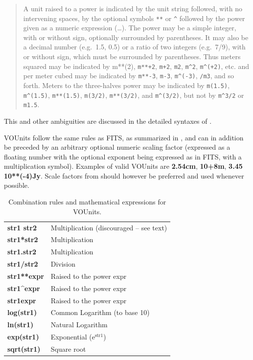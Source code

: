 \documentclass[11pt,notitlepage,onecolumn]{ivoa}
\def\eg{e.g.~}
\newcommand{\unit}[1]{\textbf{\textsf{\color{orange}#1}}}
\begin{document}
\begin{quote}
A unit raised to a power is indicated by the unit string followed,
with no intervening spaces, by the optional symbols \texttt{**}
or \texttt{\^{}} followed by the power given as a numeric expression (\dots). 
The power may be a simple integer, with or
without sign, optionally surrounded by parentheses. It may also
be a decimal number (\eg 1.5, 0.5) or a ratio of two integers
(\eg 7/9), with or without sign, which must be surrounded by
parentheses. Thus meters squared may be indicated by m**(2),
\texttt{m**+2}, \texttt{m+2}, \texttt{m2}, \texttt{m\^{}2}, \texttt{m\^{}(+2)}, etc. and per meter cubed may be
indicated by \texttt{m**-3}, \texttt{m-3}, \texttt{m\^{}(-3)}, \texttt{/m3}, and so forth. Meters to
the three-halves power may be indicated by \texttt{m(1.5)}, \texttt{m\^{}(1.5)},
\texttt{m**(1.5)}, \texttt{m(3/2)}, \texttt{m**(3/2)}, and \texttt{m\^{}(3/2)}, but not by \texttt{m\^{}3/2}
or \texttt{m1.5}.~\cite[\S4.3.1]{pence10}
\end{quote}

This and other ambiguities are discussed in the detailed syntaxes of .

VOUnits follow the same rules as FITS, as summarized in , and can in
addition be preceded by an arbitrary optional numeric scaling factor (expressed as a floating number with the optional
exponent being expressed as in FITS, with a multiplication symbol).
Examples of valid VOUnits are \unit{2.54cm}, \unit{10+8m}, \unit{3.45 10**(-4)Jy}. 
Scale factors from  should however be
preferred and used whenever possible.

\begin{table}
\begin{center}
\begin{tabular}[bht]{|l|l|}
\hline
\unit{str1 str2} & Multiplication (discouraged -- see text)\\
\unit{str1*str2} & Multiplication \\
\unit{str1.str2} & Multiplication \\
\unit{str1/str2} & Division \\
\unit{str1**expr} & Raised to the power expr \\
\unit{str1\^{}expr} & Raised to the power expr \\
\unit{str1expr} & Raised to the power expr \\
\unit{log(str1)} & Common Logarithm (to base 10) \\
\unit{ln(str1)} & Natural Logarithm \\
\unit{exp(str1)} & Exponential (e$^\mathrm{str1}$) \\
\unit{sqrt(str1)} & Square root \\
\hline
\end{tabular}
\end{center}
 \caption{Combination rules and mathematical expressions for VOUnits.}
  \label{tab:VOUnitCombine}
\end{table}
\end{document}
